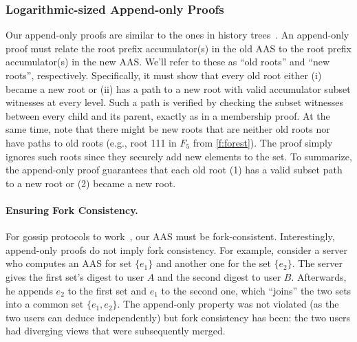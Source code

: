\subsubsection{Logarithmic-sized Append-only Proofs}
Our append-only proofs are similar to the ones in history trees~\cite{ht}.
An append-only proof must relate the root prefix accumulator(s) in the old AAS to the root prefix accumulator(s) in the new AAS.
We'll refer to these as ``old roots'' and ``new roots'', respectively.
Specifically, it must show that every old root either (i) became a new root or (ii) has a path to a new root with valid accumulator subset witnesses at every level.
Such a path is verified by checking the subset witnesses between every child and its parent, exactly as in a membership proof.
At the same time, note that there might be new roots that are neither old roots nor have paths to old roots (e.g., root 111 in $F_5$ from \cref{f:forest}).
The proof simply ignores such roots since they securely add new elements to the set.
To summarize, the append-only proof guarantees that each old root (1) has a valid subset path to a new root or (2) became a new root.

\paragraph{Ensuring Fork Consistency.}
For gossip protocols to work~\cite{CSP+15,DPV+18}, our AAS must be fork-consistent.
Interestingly, append-only proofs do not imply fork consistency.
For example, consider a server who computes an AAS for set $\{e_1\}$ and another one for the set $\{e_2\}$. 
The server gives the first set's digest to user $A$ and the second digest to user $B$.
Afterwards, he appends $e_2$ to the first set and $e_1$ to the second one, which ``joins'' the two sets into a common set $\{e_1,e_2\}$.
The append-only property was not violated (as the two users can deduce independently) but fork consistency has been: the two users had diverging views that were subsequently merged.

